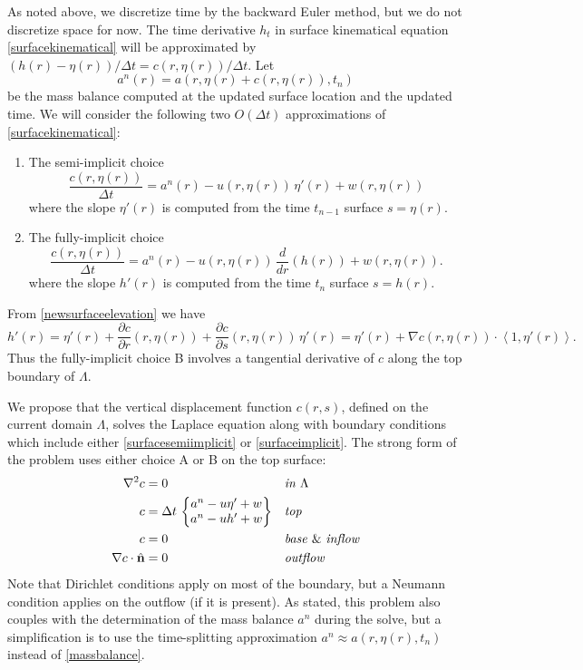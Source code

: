 \documentclass[letterpaper,final,12pt,reqno]{amsart}
\newcommand{\grad}{\nabla}
\newcommand{\hbn}{\hat{\mathbf{n}}}
\begin{document}
As noted above, we discretize time by the backward Euler method, but we do not discretize space for now.  The time derivative $h_t$ in surface kinematical equation \eqref{surfacekinematical} will be approximated by $(h(r) - \eta(r))/\Delta t = c(r,\eta(r))/\Delta t$.  Let
\begin{equation}
a^n(r) = a\left(r,\eta(r) + c(r,\eta(r)),t_n\right) \label{massbalance}
\end{equation}
be the mass balance computed at the updated surface location and the updated time.  We will consider the following two $O(\Delta t)$ approximations of \eqref{surfacekinematical}:
\renewcommand{\labelenumi}{\Alph{enumi}.}
\begin{enumerate}
\item The semi-implicit choice
\begin{equation}
\frac{c(r,\eta(r))}{\Delta t} = a^n(r) - u(r,\eta(r))\,\eta'(r) + w(r,\eta(r)) \label{surfacesemiimplicit}
\end{equation}
where the slope $\eta'(r)$ is computed from the time $t_{n-1}$ surface $s=\eta(r)$.
\item The fully-implicit choice
\begin{equation}
\frac{c(r,\eta(r))}{\Delta t} = a^n(r) - u(r,\eta(r))\,\frac{d}{dr}(h(r)) + w(r,\eta(r)). \label{surfaceimplicit}
\end{equation}
where the slope $h'(r)$ is computed from the time $t_n$ surface $s=h(r)$.
\end{enumerate}
From \eqref{newsurfaceelevation} we have
    $$h'(r)=\eta'(r) + \frac{\partial c}{\partial r}(r,\eta(r)) + \frac{\partial c}{\partial s}(r,\eta(r)) \,\eta'(r) = \eta'(r) + \grad c (r,\eta(r)) \cdot \left<1,\eta'(r)\right>.$$
Thus the fully-implicit choice B involves a tangential derivative of $c$ along the top boundary of $\Lambda$.

We propose that the vertical displacement function $c(r,s)$, defined on the current domain $\Lambda$, solves the Laplace equation along with boundary conditions which include either \eqref{surfacesemiimplicit} or \eqref{surfaceimplicit}.  The strong form of the problem uses either choice A or B on the top surface:
\begin{align}
        \grad^2 c &= 0 &&\emph{in } \Lambda \label{claplace} \\
                c &= \Delta t\,\begin{Bmatrix} a^n - u \eta' + w \\ a^n - u h' + w \end{Bmatrix} &&\emph{top} \notag \\
                c &= 0 &&\text{\emph{base} \& \emph{inflow}} \notag \\
\grad c\cdot \hbn &= 0 &&\emph{outflow} \notag
\end{align}
Note that Dirichlet conditions apply on most of the boundary, but a Neumann condition applies on the outflow (if it is present).  As stated, this problem also couples with the determination of the mass balance $a^n$ during the solve, but a simplification is to use the time-splitting approximation $a^n \approx a(r,\eta(r),t_n)$ instead of \eqref{massbalance}.
\end{document}
